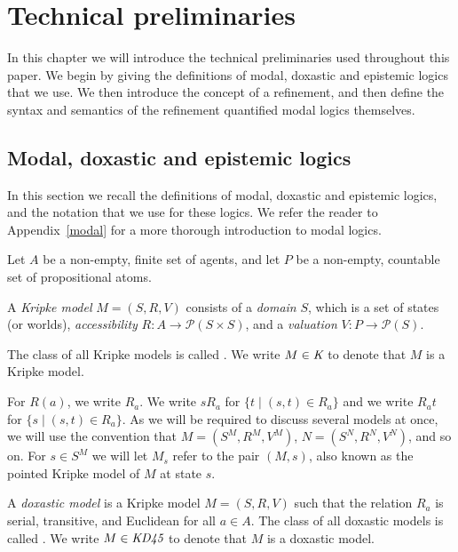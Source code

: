 \chapter{Technical preliminaries}\label{semantics}

In this chapter we will introduce the technical preliminaries used throughout
this paper. We begin by giving the definitions of modal, doxastic and epistemic
logics that we use. We then introduce the concept of a refinement, and then
define the syntax and semantics of the refinement quantified modal logics
themselves.

\section{Modal, doxastic and epistemic logics}

In this section we recall the definitions of modal, doxastic and epistemic
logics, and the notation that we use for these logics. We refer the reader to
Appendix~\ref{modal} for a more thorough introduction to modal logics.

Let $A$ be a non-empty, finite set of agents, and let $P$ be a non-empty,
countable set of propositional atoms.

\begin{definition}
A \textit{Kripke model} $M = (S, R, V)$ consists of a \textit{domain} $S$, which
is a set of states (or worlds), \textit{accessibility} $R : A \to \mathcal{P}(S
\times S)$, and a \textit{valuation} $V : P \to \mathcal{P}(S)$. 

The class of all Kripke models is called \classK{}. We write $M \in \textit{K}{}$
to denote that $M$ is a Kripke model.
\end{definition}

For $R(a)$, we write $R_a$. We write $sR_a$ for $\{t \mid (s, t) \in R_a\}$ and
we write $R_at$ for $\{s \mid (s, t) \in R_a\}$. As we will be required to
discuss several models at once, we will use the convention that $M = (S^M, R^M,
V^M)$, $N = (S^N, R^N, V^N)$, and so on. For $s \in S^M$ we will let $M_s$ refer
to the pair $(M, s)$, also known as the pointed Kripke model of $M$ at state
$s$.

\begin{definition}
A \textit{doxastic model} is a Kripke model $M = (S, R, V)$ such that the
relation $R_a$ is serial, transitive, and Euclidean for all $a \in A$. The class
of all doxastic models is called \classKD{}. We write $M \in \textit{KD45}{}$ to
denote that $M$ is a doxastic model.
\end{definition}

